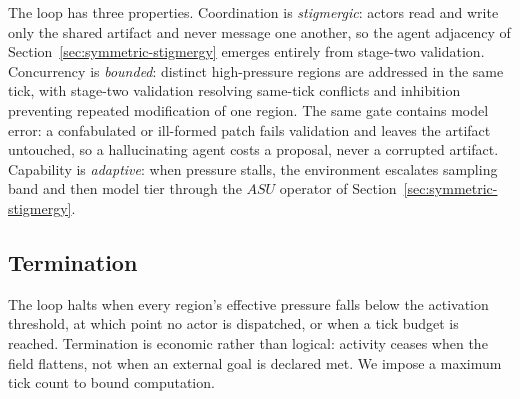 The loop has three properties. Coordination is \emph{stigmergic}: actors read and write only the shared artifact and never message one another, so the agent adjacency of Section~\ref{sec:symmetric-stigmergy} emerges entirely from stage-two validation. Concurrency is \emph{bounded}: distinct high-pressure regions are addressed in the same tick, with stage-two validation resolving same-tick conflicts and inhibition preventing repeated modification of one region. The same gate contains model error: a confabulated or ill-formed patch fails validation and leaves the artifact untouched, so a hallucinating agent costs a proposal, never a corrupted artifact. Capability is \emph{adaptive}: when pressure stalls, the environment escalates sampling band and then model tier through the $ASU$ operator of Section~\ref{sec:symmetric-stigmergy}.

\subsection{Termination}

The loop halts when every region's effective pressure falls below the activation threshold, at which point no actor is dispatched, or when a tick budget is reached. Termination is economic rather than logical: activity ceases when the field flattens, not when an external goal is declared met. We impose a maximum tick count to bound computation.
